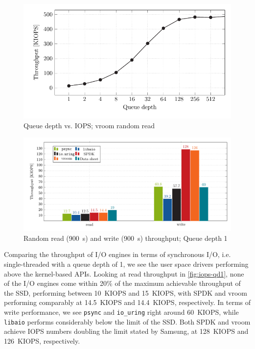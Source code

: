 \begin{figure}[H]
  \centering
  \includegraphics[width=\textwidth]{figures/vroom-iops-qd}
  \caption{Queue depth vs. IOPS; vroom random read}
  \label{fig:vroom-iops-qd}
\end{figure}


\begin{figure}[H]
  \centering
    \includegraphics[width=\textwidth]{figures/iops-qd1-ybar}
    \caption{Random read (\qty{900}{\second}) and write (\qty{900}{\second}) throughput; Queue depth 1}
    \label{fig:iops-qd1}
\end{figure}

Comparing the throughput of I/O engines in terms of synchronous I/O, i.e. single-threaded with a queue depth of 1, we see the user space drivers performing above the kernel-based APIs. Looking at read throughput in \autoref{fig:iops-qd1}, none of the I/O engines come within 20\% of the maximum achievable throughput of the SSD, performing between \qty{10}{KIOPS} and \qty{15}{KIOPS}, with SPDK and vroom performing comparably at \qty{14.5}{KIOPS} and \qty{14.4}{KIOPS}, respectively. In terms of write performance, we see \texttt{psync} and \texttt{io\_uring} right around \qty{60}{KIOPS}, while \texttt{libaio} performs considerably below the limit of the SSD. Both SPDK and vroom achieve IOPS numbers doubling the limit stated by Samsung, at \qty{128}{KIOPS} and \qty{126}{KIOPS}, respectively.


